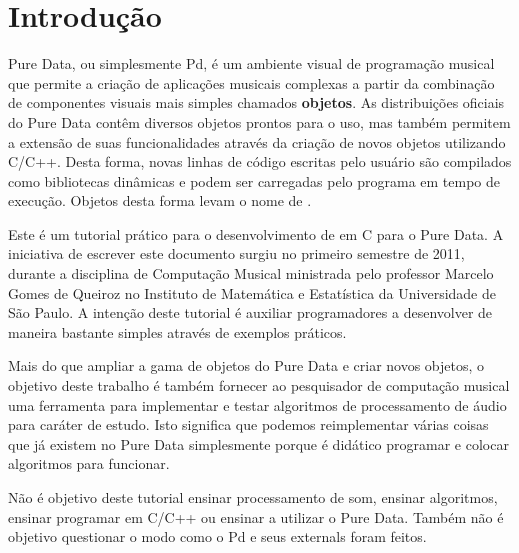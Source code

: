  
\chapter{Introdução}


Pure Data, ou simplesmente Pd, é um ambiente visual de programação musical que
permite a criação de aplicações musicais complexas a partir da combinação de
componentes visuais mais simples chamados \textbf{objetos}.
As distribuições oficiais do Pure Data contêm diversos objetos prontos para o
uso, mas também permitem a extensão de suas funcionalidades através da criação
de novos objetos utilizando C/C++.
Desta forma, novas linhas de código escritas pelo usuário são compilados como
bibliotecas dinâmicas e podem ser carregadas pelo programa em tempo de
execução.
Objetos desta forma levam o nome de \textbf{\externals}.

Este é um tutorial prático para o desenvolvimento de \externals em C para o
Pure Data.
A iniciativa de escrever este documento surgiu no primeiro semestre
de 2011, durante a disciplina de Computação Musical ministrada pelo professor
Marcelo Gomes de Queiroz no Instituto de Matemática e Estatística da
Universidade de São Paulo.
A intenção deste tutorial é auxiliar programadores a desenvolver \externals de
maneira bastante simples através de exemplos práticos.

Mais do que ampliar a gama de objetos do Pure Data e criar novos objetos, o
objetivo deste trabalho é também fornecer ao pesquisador de computação musical
uma ferramenta para implementar e testar algoritmos de processamento de áudio
para caráter de estudo.
Isto significa que podemos reimplementar várias coisas que já existem no Pure
Data simplesmente porque é didático programar e colocar algoritmos para
funcionar.

Não é objetivo deste tutorial ensinar processamento de som, ensinar algoritmos, 
ensinar programar em C/C++ ou ensinar a utilizar o Pure Data.
Também não é objetivo questionar o modo como o Pd e seus externals foram feitos.


